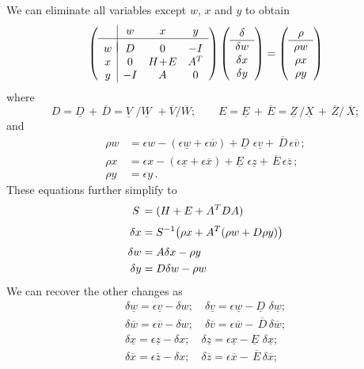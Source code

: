 \documentclass[11pt,a4paper]{article}
\newcommand{\unl}[1]{{\ \!\underline{\;\!\!#1\;\!\!}\ \!}}
\renewcommand{\unl}[1]{{\underline{#1}}}
\newcommand{\ovl}[1]{{\bar{#1}}}
\renewcommand{\ovl}[1]{{\overline{#1}}}
\newcommand{\vl}{{\unl{v}}}
\newcommand{\wl}{{\unl{w}}}
\newcommand{\xl}{{\unl{x}}}
\newcommand{\zl}{{\unl{z}}}
\newcommand{\Dl}{{\underline{D\!}\,}}
\newcommand{\El}{{\underline{E\!}\,}}
\newcommand{\Vl}{{\underline{V\!\!}\,\,}}
\newcommand{\Wl}{{\underline{W\!\!}\,\,}}
\newcommand{\Xl}{{\underline{X\!}\,}}
\newcommand{\Zl}{{\underline{Z\!}\,}}
\newcommand{\vu}{{\ovl{v}}}
\newcommand{\wu}{{\ovl{w}}}
\newcommand{\xu}{{\ovl{x}}}
\newcommand{\zu}{{\ovl{z}}}
\newcommand{\Du}{{\,\overline{\!D}}}
\newcommand{\Eu}{{\,\overline{\!E}}}
\newcommand{\Vu}{{\overline{V}}}
\newcommand{\Wu}{{\overline{W}}}
\newcommand{\Xu}{{\,\overline{\!X}}}
\newcommand{\Zu}{{\,\overline{\!Z}}}
\newcommand{\w}{w}
\newcommand{\x}{x}
\newcommand{\y}{y}
\begin{document}
We can eliminate all variables except $w$, $x$ and $y$ to obtain
\begin{equation*}
\left( \begin{array}{c|ccc}
    & \w&\x&\y \\ \hline \\[-2ex]
  \w & D & 0 & -I \\
  \x & 0 & H\!+\!E & A^T \\
  \y & -I & A & 0
\end{array}\right)
\left( \begin{array}{c} \delta\\\hline \delta\w\\\delta\x\\\delta\y \end{array}\right)
= \left( \begin{array}{c} \rho\\\hline \rho\w\\\rho\x\\\rho\y \end{array}\right)
\end{equation*}
where
\[ D = \Dl + \Du = \Vl/\Wl+\Vu/\Wu; \qquad E = \El + \Eu = \Zl/\Xl+\Zu/\Xu ; \]
and
\[ \begin{aligned}
      \rho\w &= \epsilon\w - (\epsilon\wl+\epsilon\wu) + \Dl\,\epsilon\vl + \Du\,\epsilon\vu \,; \\
      \rho\x &= \epsilon\x - (\epsilon\xl+\epsilon\xu) + \El\,\epsilon\zl + \Eu\,\epsilon\zu \,; \\
      \rho\y &= \epsilon\y \,.
   \end{aligned} \]
These equations further simplify to
\[ \begin{aligned}
        S\, &= (H+E+A^TDA) \\[\jot]
        \delta\x &= S^{-1} \bigl(\rho\x+A^T(\rho\w+D\rho\y)\bigr) \\[\jot]
        \delta\w &= A \delta\x - \rho\y \\
        \delta\y &= D \delta\w - \rho\w
   \end{aligned} \]
We can recover the other changes as
\[ \begin{gathered}
      \delta\wl = \epsilon\vl - \delta\w; \quad \delta\vl = \epsilon\wl - \Dl\,\delta\wl; \\
      \delta\wu = \epsilon\vu - \delta\w; \quad \delta\vu = \epsilon\wu - \Du\,\delta\wu; \\
      \delta\xl = \epsilon\zl - \delta\x; \quad \delta\zl = \epsilon\xl - \El\,\delta\xl; \\
      \delta\xu = \epsilon\zu - \delta\x; \quad \delta\zu = \epsilon\xu - \Eu\,\delta\xu; \\
    \end{gathered} \]
\end{document}

